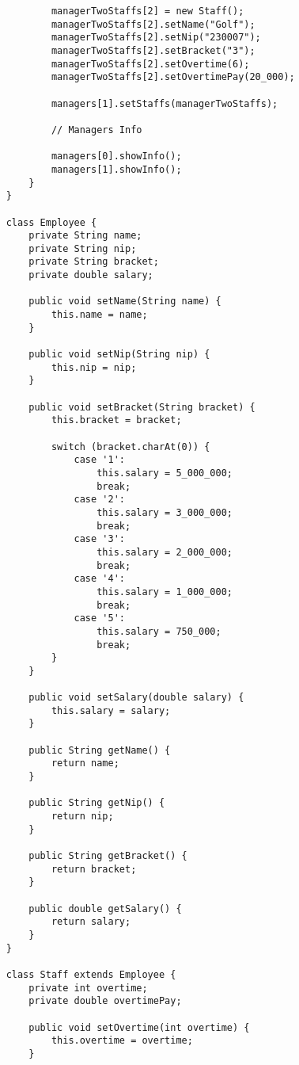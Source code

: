 \documentclass[12pt,titlepage]{article}
\begin{document}
\begin{verbatim}
            managerTwoStaffs[2] = new Staff();
            managerTwoStaffs[2].setName("Golf");
            managerTwoStaffs[2].setNip("230007");
            managerTwoStaffs[2].setBracket("3");
            managerTwoStaffs[2].setOvertime(6);
            managerTwoStaffs[2].setOvertimePay(20_000);

            managers[1].setStaffs(managerTwoStaffs);

            // Managers Info

            managers[0].showInfo();
            managers[1].showInfo();
        }
    }

    class Employee {
        private String name;
        private String nip;
        private String bracket;
        private double salary;

        public void setName(String name) {
            this.name = name;
        }

        public void setNip(String nip) {
            this.nip = nip;
        }

        public void setBracket(String bracket) {
            this.bracket = bracket;

            switch (bracket.charAt(0)) {
                case '1': 
                    this.salary = 5_000_000;
                    break;
                case '2': 
                    this.salary = 3_000_000;
                    break;
                case '3':
                    this.salary = 2_000_000;
                    break;
                case '4':
                    this.salary = 1_000_000;
                    break;
                case '5':
                    this.salary = 750_000;
                    break;
            }
        }

        public void setSalary(double salary) {
            this.salary = salary;
        }

        public String getName() {
            return name;
        }

        public String getNip() {
            return nip;
        }

        public String getBracket() {
            return bracket;
        }

        public double getSalary() {
            return salary;
        }
    }

    class Staff extends Employee {
        private int overtime;
        private double overtimePay;

        public void setOvertime(int overtime) {
            this.overtime = overtime;
        }


\end{verbatim}
\end{document}
